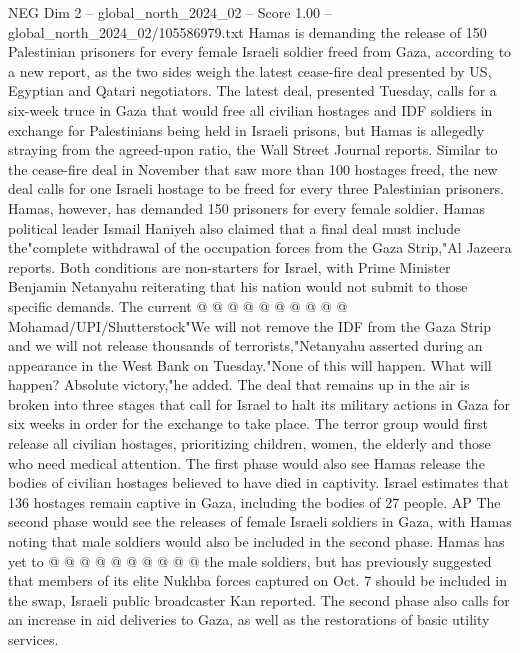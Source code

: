 \begin{textsample}{NEG Dim 2 – global\_north\_2024\_02 – Score 1.00 – global\_north\_2024\_02/105586979.txt}  \label{ex:f2_neg_175}
Hamas is demanding the release of 150 Palestinian prisoners for every female Israeli soldier freed from Gaza, according to a new report, as the two sides weigh the latest cease-fire deal presented by US, Egyptian and Qatari negotiators.
The latest deal, presented Tuesday, calls for a six-week truce in Gaza that would free all civilian hostages and IDF soldiers in exchange for Palestinians being held in Israeli prisons, but Hamas is allegedly straying from the agreed-upon ratio, the Wall Street Journal reports.
Similar to the cease-fire deal in November that saw more than 100 hostages freed, the new deal calls for one Israeli hostage to be freed for every three Palestinian prisoners.
Hamas, however, has demanded 150 prisoners for every female soldier.
Hamas political leader Ismail Haniyeh also claimed that a final deal must include the"complete withdrawal of the occupation forces from the Gaza Strip,"Al Jazeera reports.
Both conditions are non-starters for Israel, with Prime Minister Benjamin Netanyahu reiterating that his nation would not submit to those specific demands.
The current @ @ @ @ @ @ @ @ @ @ Mohamad/UPI/Shutterstock"We will not remove the IDF from the Gaza Strip and we will not release thousands of terrorists,"Netanyahu asserted during an appearance in the West Bank on Tuesday."None of this will happen.
What will happen?
Absolute victory,"he added.
The deal that remains up in the air is broken into three stages that call for Israel to halt its military actions in Gaza for six weeks in order for the exchange to take place.
The terror group would first release all civilian hostages, prioritizing children, women, the elderly and those who need medical attention.
The first phase would also see Hamas release the bodies of civilian hostages believed to have died in captivity.
Israel estimates that 136 hostages remain captive in Gaza, including the bodies of 27 people.
AP The second phase would see the releases of female Israeli soldiers in Gaza, with Hamas noting that male soldiers would also be included in the second phase.
Hamas has yet to @ @ @ @ @ @ @ @ @ @ the male soldiers, but has previously suggested that members of its elite Nukhba forces captured on Oct. 7 should be included in the swap, Israeli public broadcaster Kan reported.
The second phase also calls for an increase in aid deliveries to Gaza, as well as the restorations of basic utility services.

\end{textsample}
